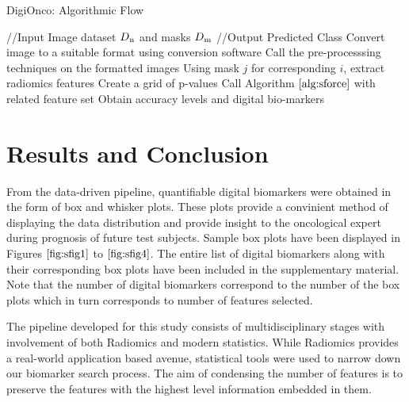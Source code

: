 \documentclass[final,1p,times,twocolumn]{elsarticle}
\begin{document}
\begin{algorithm}[!t]
\caption{DigiOnco: Algorithmic Flow}\label{main}
\begin{algorithmic}[1]
\footnotesize
\STATE //Input Image dataset $D\textsubscript{n}$ and masks $D\textsubscript{m}$ 
\STATE //Output Predicted Class
\STATE Convert image to a suitable format using conversion software
\STATE Call the pre-processsing techniques on the formatted images
\STATE Using mask $j$ for corresponding $i$, extract radiomics features
\STATE Create a grid of p-values
\STATE Call Algorithm $\ref{alg:sforce}$ with related feature set
\ENDFOR
\STATE Obtain accuracy levels and digital bio-markers
\ENDFOR
\end{algorithmic}
\end{algorithm}

\section{Results and Conclusion}

From the data-driven pipeline, quantifiable digital biomarkers were obtained in the form of box and whisker plots. These plots provide a convinient method of displaying the data distribution and provide insight to the oncological expert during prognosis of future test subjects. Sample box plots have been displayed in Figures $\ref{fig:sfig1}$ to $\ref{fig:sfig4}$. The entire list of digital biomarkers along with their corresponding box plots have been included in the supplementary material. Note that the number of digital biomarkers correspond to the number of the box plots which in turn corresponds to number of features selected. 

The pipeline developed for this study consists of multidisciplinary stages with involvement of both Radiomics and modern statistics. While Radiomics provides a real-world application based avenue, statistical tools were used to narrow down our biomarker search process. The aim of condensing the number of features is to preserve the features with the highest level information embedded in them. 
\end{document}
